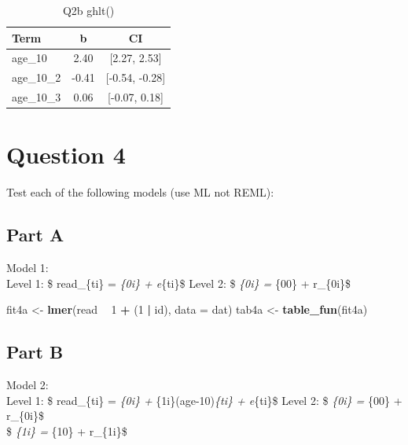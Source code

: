 \documentclass[]{article}
\newenvironment{Shaded}{\begin{snugshade}}{\end{snugshade}}
\newcommand{\KeywordTok}[1]{\textcolor[rgb]{0.13,0.29,0.53}{\textbf{#1}}}
\newcommand{\DataTypeTok}[1]{\textcolor[rgb]{0.13,0.29,0.53}{#1}}
\newcommand{\DecValTok}[1]{\textcolor[rgb]{0.00,0.00,0.81}{#1}}
\newcommand{\StringTok}[1]{\textcolor[rgb]{0.31,0.60,0.02}{#1}}
\newcommand{\OperatorTok}[1]{\textcolor[rgb]{0.81,0.36,0.00}{\textbf{#1}}}
\newcommand{\NormalTok}[1]{#1}
\begin{document}
\begin{table}

\caption{\label{tab:unnamed-chunk-4}Q2b ghlt()}
\centering
\begin{tabular}[t]{lcc}
\toprule
Term & b & CI\\
\midrule
age\_10 & 2.40 & [2.27, 2.53]\\
age\_10\_2 & -0.41 & [-0.54, -0.28]\\
age\_10\_3 & 0.06 & [-0.07, 0.18]\\
\bottomrule
\end{tabular}
\end{table}

\section{Question 4}\label{question-4}

Test each of the following models (use ML not REML):

\subsection{Part A}\label{part-a-1}

Model 1:\\
Level 1: \$ read\_\{ti\} = \pi\emph{\{0i\} + e}\{ti\}\$ Level 2: \$
\pi\emph{\{0i\} = \beta}\{00\} + r\_\{0i\}\$

\begin{Shaded}
\begin{Highlighting}[]
\NormalTok{fit4a <-}\StringTok{ }\KeywordTok{lmer}\NormalTok{(read }\OperatorTok{~}\StringTok{ }\DecValTok{1} \OperatorTok{+}\StringTok{ }\NormalTok{(}\DecValTok{1} \OperatorTok{|}\StringTok{ }\NormalTok{id), }\DataTypeTok{data =}\NormalTok{ dat)}
\NormalTok{tab4a <-}\StringTok{ }\KeywordTok{table_fun}\NormalTok{(fit4a)}
\end{Highlighting}
\end{Shaded}

\subsection{Part B}\label{part-b-1}

Model 2:\\
Level 1: \$ read\_\{ti\} = \pi\emph{\{0i\} +
\pi}\{1i\}(age-10)\emph{\{ti\} + e}\{ti\}\$ Level 2: \$ \pi\emph{\{0i\}
= \beta}\{00\} + r\_\{0i\}\$\\
\$ \pi\emph{\{1i\} = \beta}\{10\} + r\_\{1i\}\$
\end{document}

